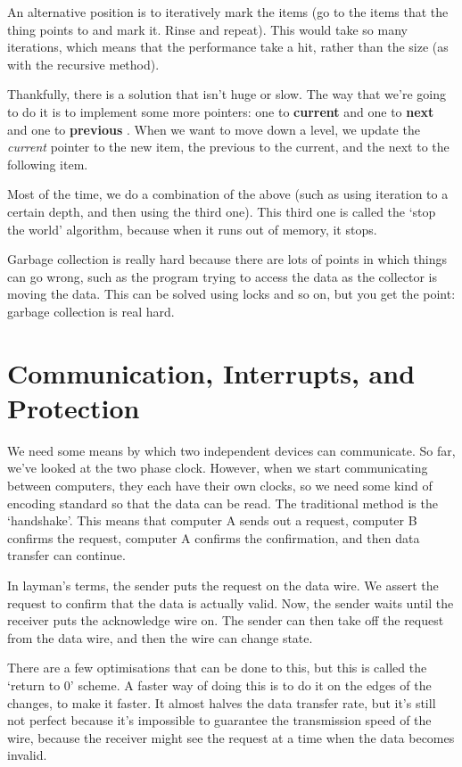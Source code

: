 \documentclass[11pt,a4paper,titlepage,dvipsnames,cmyk]{scrartcl}
\begin{document}
An alternative position is to iteratively mark the items (go to the items
that the thing points to and mark it. Rinse and repeat). This would take
so many iterations, which means that the performance take a hit, rather
than the size (as with the recursive method).

Thankfully, there is a solution that isn't huge or slow. The way that
we're going to do it is to implement some more pointers: one to
\textbf{current} and one to \textbf{next} and one to \textbf{previous} .
When we want to move down a level, we update the \textit{current} pointer
to the new item, the previous to the current, and the next to the
following item.

Most of the time, we do a combination of the above (such as using
iteration to a certain depth, and then using the third one). This third
one is called the `stop the world' algorithm, because when it runs out of
memory, it stops. 

Garbage collection is really hard because there are lots of points in
which things can go wrong, such as the program trying to access the data
as the collector is moving the data. This can be solved using locks and so
on, but you get the point: garbage collection is real hard. 

\section{Communication, Interrupts, and Protection}%
\label{sec:interrupts}
We need some means by which two independent devices can communicate. So
far, we've looked at the two phase clock. However, when we start
communicating between computers, they each have their own clocks, so we
need some kind of encoding standard so that the data can be read. The
traditional method is the `handshake'. This means that computer A sends
out a request, computer B confirms the request, computer A confirms the
confirmation, and then data transfer can continue.

In layman's terms, the sender puts the request on the data wire. We
assert the request to confirm that the data is actually valid. Now, the
sender waits until the receiver puts the acknowledge wire on. The sender
can then take off the request from the data wire, and then the wire can
change state.

There are a few optimisations that can be done to this, but this is called
the `return to 0' scheme. A faster way of doing this is to do it on the
edges of the changes, to make it faster. It almost halves the data
transfer rate, but it's still not perfect because it's impossible to
guarantee the transmission speed of the wire, because the receiver might
see the request at a time when the data becomes invalid.
\end{document}
